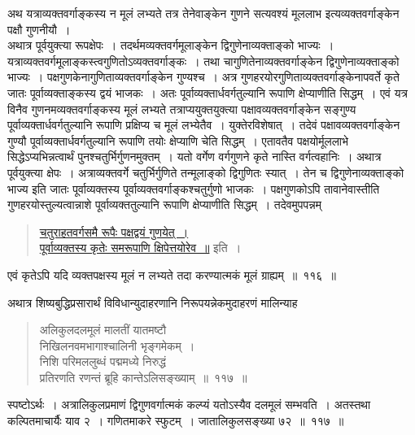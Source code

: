 \documentclass[11pt, openany]{book}
\begin{document}
\vspace{-4mm}
 अथ यत्राव्यक्तवर्गाङ्कस्य न मूलं लभ्यते तत्र तेनेवाङ्केन गुणने
सत्यवश्यं 
मूललाभ इत्यव्यक्तवर्गाङ्केन पक्षौ गुणनीयौ~। \\

\vspace{-4mm}
 अथात्र पूर्वयुक्त्या रूपक्षेपः~। तदर्थमव्यक्तवर्गमूलाङ्केन
द्विगुणेनाव्यक्ताङ्को 
भाज्यः~। यत्राव्यक्तवर्गमूलाङ्कस्त्वगुणितोऽव्यक्तवर्गाङ्कः~। तथा
चागुणितेनाव्यक्तवर्गाङ्केन द्विगुणेनाव्यक्ताङ्को भाज्यः~।
पक्षगुणकेनागुणिताव्यक्तवर्गाङ्केन गुण्यश्च~। 
अत्र गुणहरयोरगुणिताव्यक्तवर्गाङ्केनापवर्ते कृते जातः
पूर्वाव्यक्ताङ्कस्य द्वयं 
भाजकः~। अतः पूर्वाव्यक्तार्धवर्गतुल्यानि रूपाणि क्षेप्याणीति
सिद्धम्~। एवं यत्र 
विनैव गुणनमव्यक्तवर्गाङ्कस्य मूलं लभ्यते तत्राप्ययुक्तयुक्त्या
पक्षावव्यक्तवर्गाङ्केन 
सङ्गुण्य पूर्वाव्यक्तार्धवर्गतुल्यानि रूपाणि प्रक्षिप्य च मूलं लभ्येतैव~। युक्तेरविशेषात्~। 
तदेवं पक्षावव्यक्तवर्गाङ्केन गुण्यौ पूर्वाव्यक्तार्धवर्गतुल्यानि रूपाणि
तयोः क्षेप्याणि 
चेति सिद्धम्~। एतावतैव पक्षयोर्मूललाभे सिद्धेऽप्यभिन्नत्वार्थं
पुनश्चतुर्भिर्गुणनमुक्तम्~। 
यतो वर्गेण वर्गगुणने कृते नास्ति वर्गत्वहानिः~। अथात्र पूर्वयुक्त्या
क्षेपः~।
अत्राव्यक्तवर्गे चतुर्भिर्गुणिते तन्मूलाङ्को द्विगुणितः स्यात्~। तेन च
द्विगुणेनाव्यक्ताङ्को
भाज्य इति जातः पूर्वाव्यक्तस्य पूर्वाव्यक्तवर्गाङ्कश्चतुर्गुणो भाजकः~।
पक्षगुणकोऽपि
तावानेवास्तीति गुणहरयोस्तुल्यत्वान्नाशे पूर्वाव्यक्ततुल्यानि रूपाणि
क्षेप्याणीति सिद्धम्~।
तदेवमुपपन्नम्\textendash
\begin{quote}
\hyperref[116]{चतुराहतवर्गसमै रूपैः पक्षद्वयं गुणयेत्~। \\
 पूर्वाव्यक्तस्य कृतेः समरूपाणि क्षिपेत्तयोरेव~॥} इति~। 
\end{quote}
 
 एवं कृतेऽपि यदि व्यक्तपक्षस्य मूलं न लभ्यते तदा करण्यात्मकं मूलं 
ग्राह्यम्~॥~११६~॥
\newpage

 अथात्र शिष्यबुद्धिप्रसारार्थं विविधान्युदाहरणानि निरूपयन्नेकमुदाहरणं
मालिन्याह\textendash
\begin{quote}
    \eg 
    अलिकुलदलमूलं मालतीं यातमष्टौ \\
 निखिलनवमभागाश्चालिनी भृङ्गमेकम्~। \\
 निशि परिमललुब्धं पद्ममध्ये निरुद्धं \\
 प्रतिरणति रणन्तं ब्रूहि कान्तेऽलिसङ्ख्याम्~॥~११७~॥~
\end{quote}
 
 स्पष्टोऽर्थः~। अत्रालिकुलप्रमाणं द्विगुणवर्गात्मकं कल्प्यं यतोऽस्यैव
दलमूलं सम्भवति~। अतस्तथा कल्पितमाचार्यैः याव २~। गणितमाकरे स्फुटम्~। जातालिकुलसङ्ख्या ७२~॥~११७~॥ \\
\end{document}
